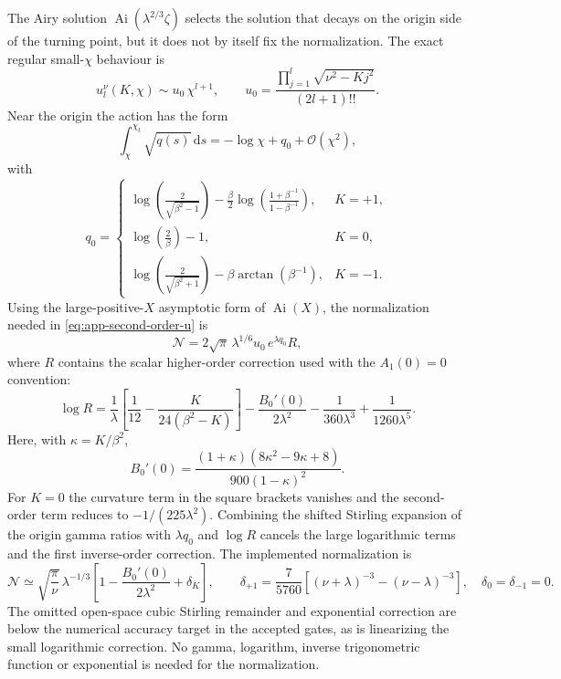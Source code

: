 \documentclass[11pt,a4paper]{article}
\newcommand{\dd}{\mathrm{d}}
\newcommand{\Ai}{\operatorname{Ai}}
\newcommand{\order}{\mathcal{O}}
\begin{document}
The Airy solution \(\Ai(\lambda^{2/3}\zeta)\) selects the solution that decays
on the origin side of the turning point, but it does not by itself fix the
normalization.  The exact regular small-\(\chi\) behaviour is
\begin{equation}
  u_l^\nu(K,\chi)\sim u_0\,\chi^{l+1},\qquad
  u_0=
  \frac{\prod_{j=1}^{l}\sqrt{\nu^2-Kj^2}}{(2l+1)!!}.
  \label{eq:app-origin-u0}
\end{equation}
Near the origin the action has the form
\begin{equation}
  \int_\chi^{\chi_t}\sqrt{q(s)}\,\dd s
  =-\log\chi+q_0+\order(\chi^2),
  \label{eq:app-origin-action}
\end{equation}
with
\begin{equation}
  q_0=
  \begin{cases}
  \displaystyle
  \log\!\left(\frac{2}{\sqrt{\beta^2-1}}\right)
  -\frac{\beta}{2}
  \log\!\left(\frac{1+\beta^{-1}}{1-\beta^{-1}}\right),
  & K=+1,\\[2ex]
  \displaystyle
  \log\!\left(\frac{2}{\beta}\right)-1,
  & K=0,\\[2ex]
  \displaystyle
  \log\!\left(\frac{2}{\sqrt{\beta^2+1}}\right)
  -\beta\arctan(\beta^{-1}),
  & K=-1.
  \end{cases}
  \label{eq:app-origin-q0}
\end{equation}
Using the large-positive-\(X\) asymptotic form of \(\Ai(X)\), the normalization
needed in \eqref{eq:app-second-order-u} is
\begin{equation}
  \mathcal N=
  2\sqrt{\pi}\,\lambda^{1/6}u_0\,e^{\lambda q_0}R,
  \label{eq:app-airy-norm}
\end{equation}
where \(R\) contains the scalar higher-order correction used with the
\(A_1(0)=0\) convention:
\begin{equation}
  \log R=
  \frac{1}{\lambda}\left[
  \frac{1}{12}-\frac{K}{24(\beta^2-K)}
  \right]
  -\frac{B_0'(0)}{2\lambda^2}
  -\frac{1}{360\lambda^3}
  +\frac{1}{1260\lambda^5}.
  \label{eq:app-airy-logR}
\end{equation}
Here, with \(\kappa=K/\beta^2\),
\begin{equation}
 B_0'(0)=\frac{(1+\kappa)(8\kappa^2-9\kappa+8)}{900(1-\kappa)^2}.
\end{equation}
For \(K=0\) the curvature term in the square brackets vanishes and the
second-order term reduces to \(-1/(225\lambda^2)\).
Combining the shifted Stirling expansion of the origin gamma ratios with
\(\lambda q_0\) and \(\log R\) cancels the large logarithmic terms and the
first inverse-order correction.  The implemented normalization is
\[
 \mathcal N\simeq \sqrt{\frac{\pi}{\nu}}\,\lambda^{-1/3}
 \left[1-\frac{B_0'(0)}{2\lambda^2}+\delta_K\right],
 \qquad
 \delta_{+1}=\frac{7}{5760}
 \left[(\nu+\lambda)^{-3}-(\nu-\lambda)^{-3}\right],
 \quad \delta_{0}=\delta_{-1}=0.
\]
The omitted open-space cubic Stirling remainder and exponential correction
are below the numerical accuracy target in the accepted gates, as is
linearizing the small logarithmic correction.  No gamma, logarithm,
inverse trigonometric function or exponential is needed for the normalization.
\end{document}
